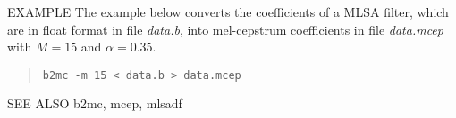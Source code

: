 \begin{options}
\end{options}

\begin{qsection}{EXAMPLE}
The example below converts the coefficients of a MLSA filter,
which are in float format in file {\em data.b},
into mel-cepstrum coefficients
in file {\em data.mcep} with $M=15$ and $\alpha=0.35$.
\begin{quote}
 \verb!b2mc -m 15 < data.b > data.mcep!
\end{quote} 
\end{qsection}

\begin{qsection}{SEE ALSO}
b2mc, mcep, mlsadf
\end{qsection}

